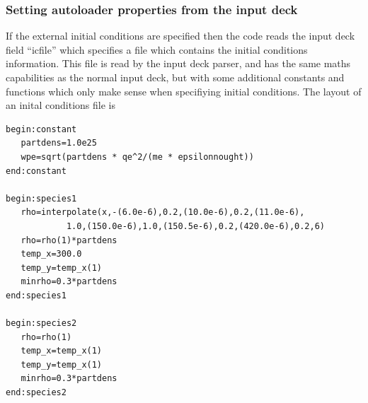 \documentclass[12pt,a4paper]{article}
\newcommand{\simpleboxverbatim}{\begin{Verbatim}[obeytabs=true,frame=single,
  framerule=0.5mm,rulecolor=\color{warwickmid},formatcom=\color{black}]}
\begin{document}
\subsubsection{Setting autoloader properties from the input deck}
If the external initial conditions are specified then the code reads the input
deck field ``icfile'' which specifies a file which contains the initial
conditions information. This file is read by the input deck parser, and has
the same maths capabilities as the normal input deck, but with some additional
constants and functions which only make sense when specifiying initial
conditions. The layout of an inital conditions file is
%
\begin{minipage}{\textwidth}
\simpleboxverbatim
begin:constant
   partdens=1.0e25
   wpe=sqrt(partdens * qe^2/(me * epsilonnought))
end:constant

begin:species1
   rho=interpolate(x,-(6.0e-6),0.2,(10.0e-6),0.2,(11.0e-6),
            1.0,(150.0e-6),1.0,(150.5e-6),0.2,(420.0e-6),0.2,6)
   rho=rho(1)*partdens
   temp_x=300.0
   temp_y=temp_x(1)
   minrho=0.3*partdens
end:species1

begin:species2
   rho=rho(1)
   temp_x=temp_x(1)
   temp_y=temp_x(1)
   minrho=0.3*partdens
end:species2
\end{Verbatim}
\end{minipage}
\end{document}

